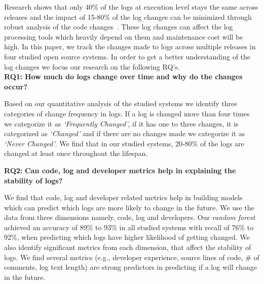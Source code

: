 Research shows that only 40\% of the logs at execution level stays the same across releases and the impact of 15-80\% of the log changes can be minimized through robust analysis of the code changes~\cite{IanWCRE}. These log changes can affect the log processing tools which heavily depend on them and maintenance cost will be high. In this paper, we track the changes made to logs across multiple releases in four studied open source systems. In order to get a better understanding of the log changes we focus our research on the following RQ's.\\


\textbf{RQ1:} \textbf{How much do logs change over time and why do the changes occur?}

Based on our quantitative analysis of the studied systems we identify three categories of change frequency in logs. If a log is changed more than four times we categorize it as \textsl{`Frequently Changed'}, if it has one to three changes, it is categorized as \textsl{`Changed'} and if there are no changes made we categorize it as \textsl{`Never Changed'}. We find that in our studied systems, 20-80\% of the logs are changed at least once throughout the lifespan. 




\textbf{RQ2:} \textbf{Can code, log and developer metrics help in explaining the stability of logs?}

 We find that code, log and developer related metrics help in building models which can predict which logs are more likely to change in the future. We use the data from three dimensions namely, code, log and developers. Our \textsl{random forest} achieved an accuracy of 89\% to 93\% in all studied systems with recall of 76\% to 92\%, when predicting which logs have higher likelihood of getting changed. We also identify significant metrics from each dimension, that affect the stability of logs. We find several metrics (e.g., developer experience, source lines of code, \# of comments, log text length) are strong predictors in predicting if a log will change in the future. 
 
